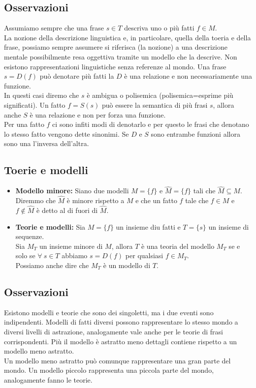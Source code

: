 \documentclass{book}
\newcommand{\spazio}{\vspace{1em} \newline}
\begin{document}
    \subsection{Osservazioni}
    Assumiamo sempre che una frase $s \in T$ descriva uno o più fatti $f \in M$.\\
    La nozione della descrizione linguistica e, in particolare, quella della toeria e della frase, possiamo sempre assumere si riferisca (la nozione) a una descrizione mentale possibilmente resa oggettiva tramite un modello che la descrive.
    \spazio
    Non esistono rappresentazioni linguistiche senza referenze al mondo.
    \spazio
    Una frase $s=D(f)$ può denotare più fatti la $D$ è una relazione e non necessariamente una funzione.\\
    In questi casi diremo che $s$ è ambigua o polisemica (polisemica=esprime più significati).
    \spazio
    Un fatto $f=S(s)$ può essere la semantica di più frasi $s$, allora anche $S$ è una relazione e non per forza una funzione.\\
    Per una fatto $f$ ci sono infiti modi di denotarlo e per questo le frasi che denotano lo stesso fatto vengono dette sinonimi.
    \spazio
    Se $D$ e $S$ sono entrambe funzioni allora sono una l'inversa dell'altra.

    \subsection{Toerie e modelli}
    \begin{itemize}
        \item \textbf{Modello minore:} Siano due modelli $M=\{f\}$ e $\widehat{M}=\{f\}$ tali che $\widehat{M}\subseteq M$.\\
            Diremmo che $\widehat{M}$ è minore rispetto a $M$ e che un fatto $f$ tale che $f \in M$ e $f \notin \widehat{M}$ è detto al di fuori di $\widehat{M}$.
        \item \textbf{Teorie e modelli:} Sia $M=\{f\}$ un insieme diu fatti e $T=\{s\}$ un insieme di sequenze.\\
            Sia $M_T$ un insieme minore di $M$, allora $T$ è una teoria del modello $M_T$ se e solo se $\forall\ s\in T$ abbiamo $s=D(f) $ per qualsiasi $f \in M_T$.\\
            Possiamo anche dire che $M_T$ è un modello di $T$. 
    \end{itemize}

    \subsection{Osservazioni}
    Esistono modelli e teorie che sono dei singoletti, ma i due eventi sono indipendenti.
    \spazio
    Modelli di fatti diversi possono rappresentare lo stesso mondo a diversi livelli di astrazione, analogamente vale anche per le teorie di frasi corrispondenti.
    \spazio
    Più il modello è astratto meno dettagli contiene rispetto a un modello meno astratto.\\
    Un modello meno astratto può comunque rappresentare una gran parte del mondo.
    \spazio
    Un modello piccolo rappresenta una piccola parte del mondo, analogamente fanno le teorie.
\end{document}
